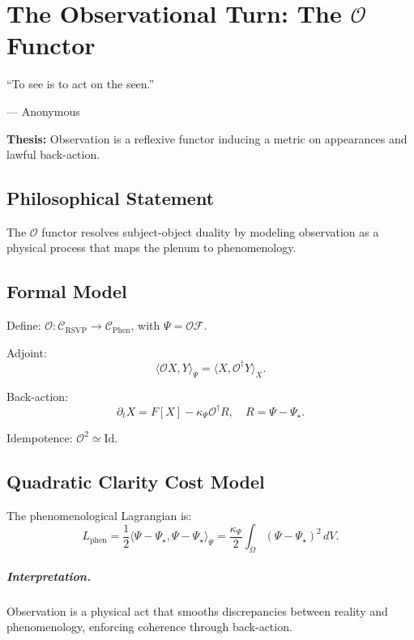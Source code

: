 \documentclass[12pt]{book}
\theoremstyle{definition}
\begin{document}
\chapter{The Observational Turn: The $\mathcal{O}$ Functor}
\label{chap:observation}
\epigraph{``To see is to act on the seen.''}{--- Anonymous}

\textbf{Thesis:} Observation is a reflexive functor inducing a metric on appearances and lawful back-action.

\section{Philosophical Statement}
The $\mathcal{O}$ functor resolves subject-object duality by modeling observation as a physical process that maps the plenum to phenomenology.

\section{Formal Model}
Define: $\mathcal{O}: \mathcal{C}_{\text{RSVP}} \to \mathcal{C}_{\text{Phen}}$, with $\Psi = \mathcal{O} \mathcal{F}$.

Adjoint:
\begin{equation}
\langle \mathcal{O}X, Y \rangle_\Psi = \langle X, \mathcal{O}^\dagger Y \rangle_X.
\end{equation}

Back-action:
\begin{equation}
\partial_t X = F[X] - \kappa_\Psi \mathcal{O}^\dagger R, \quad R = \Psi - \Psi_\star.
\end{equation}

Idempotence: $\mathcal{O}^2 \simeq \text{Id}$.

\section{Quadratic Clarity Cost Model}
The phenomenological Lagrangian is:
\begin{equation}
L_{\text{phen}} = \frac{1}{2} \langle \Psi - \Psi_\star, \Psi - \Psi_\star \rangle_\Psi = \frac{\kappa_\Psi}{2} \int_\Omega (\Psi - \Psi_\star)^2 \, dV.
\end{equation}

\paragraph{Interpretation.} Observation is a physical act that smooths discrepancies between reality and phenomenology, enforcing coherence through back-action.
\end{document}
